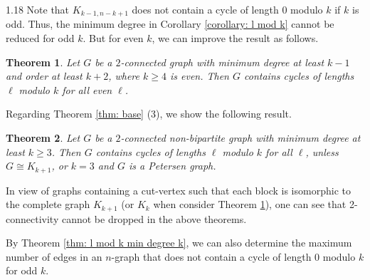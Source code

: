 \documentclass[10pt]{article}
\newtheorem{theorem}{Theorem}[section]
\begin{document}
\begin{spacing}{1.18}
    Note that $K_{k-1,n-k+1}$ does not contain a cycle of length 0 modulo $k$ if $k$ is odd. Thus, the minimum degree in Corollary \ref{corollary: l mod k} cannot be reduced for odd $k$. But for even $k$, we can improve the result as follows.

\begin{theorem}\label{thm: l mod k min degree k-1}
    Let $G$ be a $2$-connected graph with minimum degree at least $k-1$ and order at least $k+2$, where $k\geqslant 4$ is even. Then $G$ contains cycles of lengths $\ell$ modulo $k$ for all even $\ell$.
\end{theorem}


    Regarding Theorem \ref{thm: base} (3), we show the following result.

\begin{theorem}\label{thm: l mod k min degree non-bi}
    Let $G$ be a $2$-connected non-bipartite graph with minimum degree at least $k\geqslant 3$. Then $G$ contains cycles of lengths $\ell$ modulo $k$ for all $\ell$, unless $G\cong K_{k+1}$, or $k=3$ and $G$ is a Petersen graph.
\end{theorem}

   In view of graphs containing a cut-vertex such that each block is isomorphic to the complete graph $K_{k+1}$ (or $K_k$ when consider Theorem \ref{thm: l mod k min degree k-1}), one can see that 2-connectivity cannot be dropped in the above theorems. 

    By Theorem \ref{thm: l mod k min degree k}, we can also determine the maximum number of edges in an $n$-graph that does not contain a cycle of length 0 modulo $k$ for odd $k$. 
    

\end{spacing}
\end{document}
